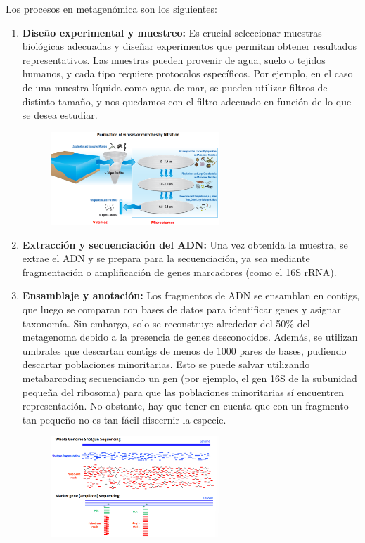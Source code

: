 Los procesos en metagenómica son los siguientes:
\begin{enumerate}
\item \textbf{Diseño experimental y muestreo:} Es crucial seleccionar muestras biológicas adecuadas y diseñar experimentos que permitan obtener resultados representativos. Las muestras pueden provenir de agua, suelo o tejidos humanos, y cada tipo requiere protocolos específicos. Por ejemplo, en el caso de una muestra líquida como agua de mar, se pueden utilizar filtros de distinto tamaño, y nos quedamos con el filtro adecuado en función de lo que se desea estudiar.

\begin{figure}[h]
\centering
\includegraphics[width = 0.6\textwidth]{figs/filtros.png}
\end{figure}

\item \textbf{Extracción y secuenciación del ADN:} Una vez obtenida la muestra, se extrae el ADN y se prepara para la secuenciación, ya sea mediante fragmentación o amplificación de genes marcadores (como el 16S rRNA).
\item \textbf{Ensamblaje y anotación:} Los fragmentos de ADN se ensamblan en contigs, que luego se comparan con bases de datos para identificar genes y asignar taxonomía. Sin embargo, solo se reconstruye alrededor del 50\% del metagenoma debido a la presencia de genes desconocidos. Además, se utilizan umbrales que descartan contigs de menos de 1000 pares de bases, pudiendo descartar poblaciones minoritarias. Esto se puede salvar utilizando metabarcoding secuenciando un gen (por ejemplo, el gen 16S de la subunidad pequeña del ribosoma) para que las poblaciones minoritarias sí encuentren representación. No obstante, hay que tener en cuenta que con un fragmento tan pequeño no es tan fácil discernir la especie.

\begin{figure}[h]
\centering
\includegraphics[width = 0.6\textwidth]{figs/assembly.png}
\end{figure}


\end{enumerate}
